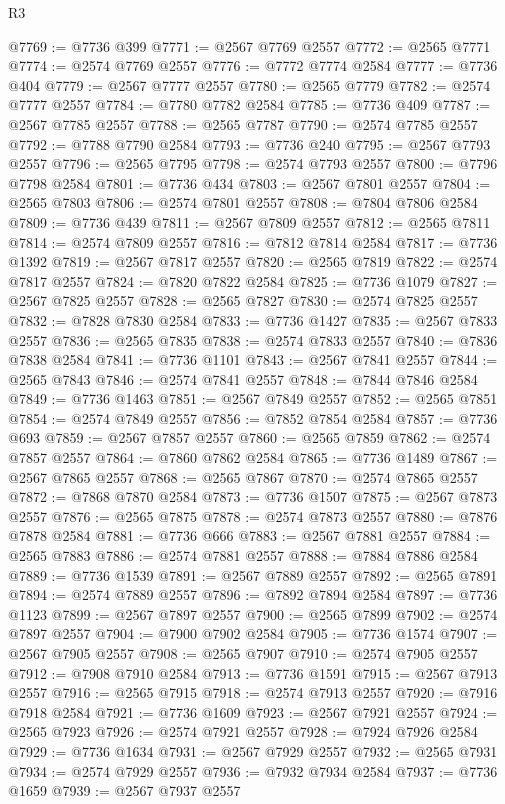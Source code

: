 \begin{lexlean}{R3}
\begin{coremodule}
@7769 := @7736 @399
@7771 := @2567 @7769 @2557
@7772 := @2565 @7771
@7774 := @2574 @7769 @2557
@7776 := @7772 @7774 @2584
@7777 := @7736 @404
@7779 := @2567 @7777 @2557
@7780 := @2565 @7779
@7782 := @2574 @7777 @2557
@7784 := @7780 @7782 @2584
@7785 := @7736 @409
@7787 := @2567 @7785 @2557
@7788 := @2565 @7787
@7790 := @2574 @7785 @2557
@7792 := @7788 @7790 @2584
@7793 := @7736 @240
@7795 := @2567 @7793 @2557
@7796 := @2565 @7795
@7798 := @2574 @7793 @2557
@7800 := @7796 @7798 @2584
@7801 := @7736 @434
@7803 := @2567 @7801 @2557
@7804 := @2565 @7803
@7806 := @2574 @7801 @2557
@7808 := @7804 @7806 @2584
@7809 := @7736 @439
@7811 := @2567 @7809 @2557
@7812 := @2565 @7811
@7814 := @2574 @7809 @2557
@7816 := @7812 @7814 @2584
@7817 := @7736 @1392
@7819 := @2567 @7817 @2557
@7820 := @2565 @7819
@7822 := @2574 @7817 @2557
@7824 := @7820 @7822 @2584
@7825 := @7736 @1079
@7827 := @2567 @7825 @2557
@7828 := @2565 @7827
@7830 := @2574 @7825 @2557
@7832 := @7828 @7830 @2584
@7833 := @7736 @1427
@7835 := @2567 @7833 @2557
@7836 := @2565 @7835
@7838 := @2574 @7833 @2557
@7840 := @7836 @7838 @2584
@7841 := @7736 @1101
@7843 := @2567 @7841 @2557
@7844 := @2565 @7843
@7846 := @2574 @7841 @2557
@7848 := @7844 @7846 @2584
@7849 := @7736 @1463
@7851 := @2567 @7849 @2557
@7852 := @2565 @7851
@7854 := @2574 @7849 @2557
@7856 := @7852 @7854 @2584
@7857 := @7736 @693
@7859 := @2567 @7857 @2557
@7860 := @2565 @7859
@7862 := @2574 @7857 @2557
@7864 := @7860 @7862 @2584
@7865 := @7736 @1489
@7867 := @2567 @7865 @2557
@7868 := @2565 @7867
@7870 := @2574 @7865 @2557
@7872 := @7868 @7870 @2584
@7873 := @7736 @1507
@7875 := @2567 @7873 @2557
@7876 := @2565 @7875
@7878 := @2574 @7873 @2557
@7880 := @7876 @7878 @2584
@7881 := @7736 @666
@7883 := @2567 @7881 @2557
@7884 := @2565 @7883
@7886 := @2574 @7881 @2557
@7888 := @7884 @7886 @2584
@7889 := @7736 @1539
@7891 := @2567 @7889 @2557
@7892 := @2565 @7891
@7894 := @2574 @7889 @2557
@7896 := @7892 @7894 @2584
@7897 := @7736 @1123
@7899 := @2567 @7897 @2557
@7900 := @2565 @7899
@7902 := @2574 @7897 @2557
@7904 := @7900 @7902 @2584
@7905 := @7736 @1574
@7907 := @2567 @7905 @2557
@7908 := @2565 @7907
@7910 := @2574 @7905 @2557
@7912 := @7908 @7910 @2584
@7913 := @7736 @1591
@7915 := @2567 @7913 @2557
@7916 := @2565 @7915
@7918 := @2574 @7913 @2557
@7920 := @7916 @7918 @2584
@7921 := @7736 @1609
@7923 := @2567 @7921 @2557
@7924 := @2565 @7923
@7926 := @2574 @7921 @2557
@7928 := @7924 @7926 @2584
@7929 := @7736 @1634
@7931 := @2567 @7929 @2557
@7932 := @2565 @7931
@7934 := @2574 @7929 @2557
@7936 := @7932 @7934 @2584
@7937 := @7736 @1659
@7939 := @2567 @7937 @2557

\end{coremodule}
\end{lexlean}
